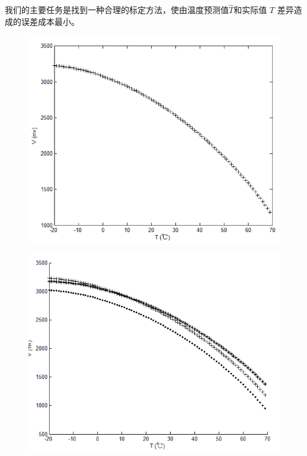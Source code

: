 \documentclass[10.5pt,twocolumn]{jbuaa}
\begin{document}
我们的主要任务是找到一种合理的标定方法，使由温度预测值$\hat T$和实际值 $T$ 差异造成的误差成本最小。
\begin{figure}[H]
\centering
\includegraphics [scale=0.4,trim=0 0 0 0]{./image/fig2.png}
\label{fig2}
\end{figure}

\begin{figure}[H]
\centering
\label{fig3}
\includegraphics [scale=0.4,trim=0 0 0 0]{./image/fig3.png}
\end{figure}
\end{document}
